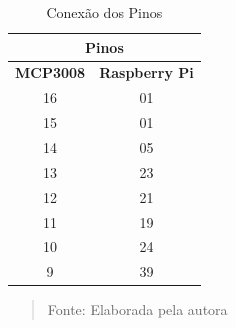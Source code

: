 \documentclass[12pt, a4paper]{article}
\begin{document}
\begin{table}[H]
\centering
\caption{Conexão dos Pinos}
\begin{center}
\label{my-label}
\begin{tabular}{|c|c|}
\hline
\multicolumn{2}{|c|}{\textbf{Pinos}} \\ \hline
\multicolumn{1}{|l|}{\textbf{MCP3008}} & \multicolumn{1}{l|}{\textbf{Raspberry Pi}} \\ \hline
16 & 01 \\ \hline
15 & 01 \\ \hline
14 & 05 \\ \hline
13 & 23 \\ \hline
12 & 21 \\ \hline
11 & 19 \\ \hline
10 & 24 \\ \hline
9 & 39 \\ \hline
\end{tabular}
\end{center}
 \vspace*{\fill} 
            \begin{quote}
            \centering 
            \vspace{12pt}Fonte: {Elaborada pela autora} 
            \end{quote}
            \vspace*{\fill}
			\label{fig:ramcor}
\end{table}
\end{document}
